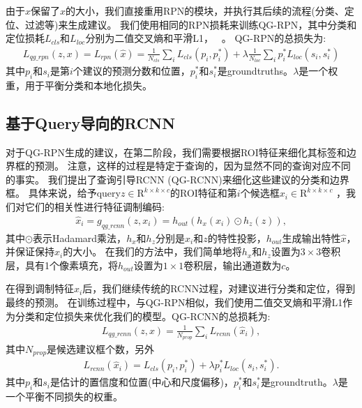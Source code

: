 \documentclass[promaster]{thesis-uestc}
\begin{document}
由于$\hat{x}$保留了$x$的大小，我们直接重用RPN的模块，并执行其后续的流程(分类、定位、过滤等)来生成建议。
我们使用相同的RPN损耗来训练QG-RPN，其中分类和定位损耗$L_{cls}$和$L_{loc}$分别为二值交叉熵和平滑L1， ~\cite{fasterrcnn2015}。
QG-RPN的总损失为:
%
\begin{eqnarray}\label{eq:rpn_loss}
    L_{qg\_rpn} (z, x) = L_{rpn} (\hat{x}) = \frac{1}{N_{cls}} \sum_i L_{cls} (p_i, p_i^*) +  
               \lambda \frac{1}{N_{loc}} \sum_i p_i^* L_{loc} (s_i, s_i^*)
\end{eqnarray}
%
其中$p_i$和$s_i$是第$i$个建议的预测分数和位置，$p_i^*$和$s_i^*$是groundtruths。$\lambda$是一个权重，用于平衡分类和本地化损失。


\subsection{基于Query导向的RCNN}
对于QG-RPN生成的建议，在第二阶段，我们需要根据ROI特征来细化其标签和边界框的预测。
注意，这样的过程是特定于查询的，因为显然不同的查询对应不同的事实。
我们提出了查询引导RCNN (QG-RCNN)来细化这些建议的分类和边界框。
%
具体来说，给予query$z \in \mathrm{R}^{k\times k\times c}$的ROI特征和第$i$个候选框$x_i \in \mathrm{R}^{k\times k\times c}$
，我们对它们的相关性进行特征调制编码:
%
\begin{eqnarray}\label{eq:rcnn_modulation}
    \hat{x}_i = g_{qg\_rcnn}(z, x_i) = h_{out} (h_x(x_i) \odot h_z(z)),
\end{eqnarray}
%
其中$\odot$表示Hadamard乘法，$h_x$和$h_z$分别是$x_i$和$z$的特性投影，$h_{out}$生成输出特性$\hat{x}$，并保证保持$x_i$的大小。
在我们的方法中，我们简单地将$h_x$和$h_z$设置为$3\times 3$卷积层，具有1个像素填充，将$h_{out}$设置为$1\times 1$卷积层，输出通道数为$c$。

在得到调制特征$\hat{x}_i$后，我们继续传统的RCNN过程，对建议进行分类和定位，得到最终的预测。
在训练过程中，与QG-RPN相似，我们使用二值交叉熵和平滑L1作为分类和定位损失来优化我们的模型。QG-RCNN的总损耗为:
%
\begin{eqnarray}\label{eq:rcnn_loss_total}
    L_{qg\_rcnn} (z, x) = \frac{1}{N_{prop}} \sum_i L_{rcnn} (\hat{x}_i),
\end{eqnarray}
%
其中$N_{prop}$是候选建议框个数，另外
%
\begin{eqnarray}\label{eq:rcnn_loss}
    L_{rcnn} (\hat{x}_i) = L_{cls} (p_i, p_i^*) + \lambda p_i^* L_{loc} (s_i, s_i^*).
\end{eqnarray}
%
其中$p_i$和$s_i$是估计的置信度和位置(中心和尺度偏移)，$p_i^*$和$s_i^*$是groundtruth。$\lambda$是一个平衡不同损失的权重。
\end{document}
